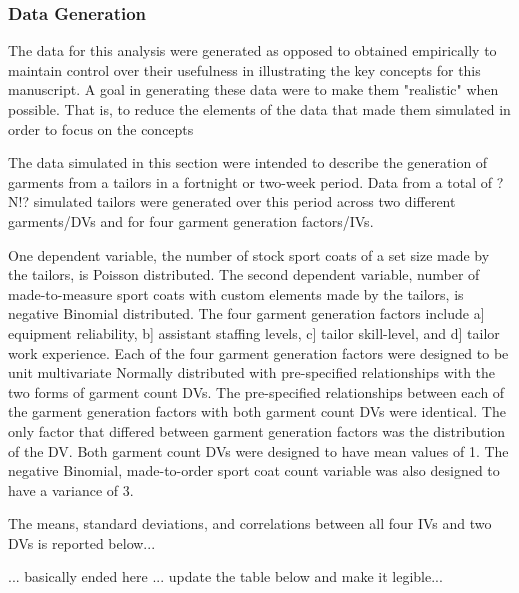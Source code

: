 \documentclass[ShortAfour,times,sageapa]{sagej}
\begin{document}
		\subsubsection{Data Generation}
		
	The data for this analysis were generated as opposed to obtained empirically to maintain control over their usefulness in illustrating the key concepts for this manuscript.
	A goal in generating these data were to make them "realistic" when possible. 
	That is, to reduce the elements of the data that made them simulated in order to focus on the concepts
	
	The data simulated in this section were intended to describe the generation of garments from a tailors in a fortnight or two-week period.
	Data from a total of 
	?N!? %
	simulated tailors were generated over this period across two different garments/DVs and for four garment generation factors/IVs.
	
	One dependent variable, the number of stock sport coats of a set size made by the tailors, is Poisson distributed. 
	The second dependent variable, number of made-to-measure sport coats with custom elements made by the tailors, is negative Binomial distributed. 
	The four garment generation factors include a] equipment reliability, b] assistant staffing levels, c] tailor skill-level, and d] tailor work experience.
	Each of the four garment generation factors were designed to be unit multivariate Normally distributed with pre-specified relationships with the two forms of garment count DVs.
	The pre-specified relationships between each of the garment generation factors with both garment count DVs were identical.
	The only factor that differed between garment generation factors was the distribution of the DV.
	Both garment count DVs were designed to have mean values of 1.
	The negative Binomial, made-to-order sport coat count variable was also designed to have a variance of 3.	
	
	The means, standard deviations, and correlations between all four IVs and two DVs is reported below...
	
	... basically ended here ... update the table below and make it legible...
	
\end{document}
